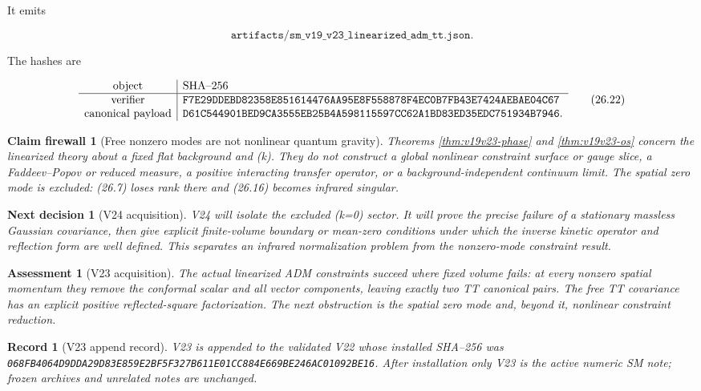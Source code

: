 \documentclass[11pt]{article}
\newtheorem{firewall}[theorem]{Claim firewall}
\newtheorem{decision}[theorem]{Next decision}
\newtheorem{assessment}[theorem]{Assessment}
\newtheorem{record}[theorem]{Record}
\theoremstyle{remark}
\begin{document}
It emits

\[
 \texttt{artifacts/sm\_v19\_v23\_linearized\_adm\_tt.json}.  \tag{26.21}
\]

The hashes are

\[
\begin{array}{c|l}
\hbox{object}&\hbox{SHA--256}\\ \hline
\hbox{verifier}&
\texttt{F7E29DDEBD82358E851614476AA95E8F558878F4EC0B7FB43E7424AEBAE04C67}\\
\hbox{canonical payload}&
\texttt{D61C544901BED9CA3555EB25B4A598115597CC62A1BD83ED35EDC751934B7946}.
\end{array}                                                     \tag{26.22}
\]

\begin{firewall}[Free nonzero modes are not nonlinear quantum gravity]
\label{fire:v19v23}
Theorems \ref{thm:v19v23-phase} and \ref{thm:v19v23-os} concern the
linearized theory about a fixed flat background and (k).  They do
not construct a global nonlinear constraint surface or gauge slice, a
Faddeev--Popov or reduced measure, a positive interacting transfer
operator, or a background-independent continuum limit.  The spatial zero
mode is excluded: (26.7) loses rank there and (26.16) becomes infrared
singular.
\end{firewall}

\begin{decision}[V24 acquisition]
\label{dec:v19v23-next}
V24 will isolate the excluded (k=0) sector.  It will prove the precise
failure of a stationary massless Gaussian covariance, then give explicit
finite-volume boundary or mean-zero conditions under which the inverse
kinetic operator and reflection form are well defined.  This separates an
infrared normalization problem from the nonzero-mode constraint result.
\end{decision}

\begin{assessment}[V23 acquisition]
\label{ass:v19v23}
The actual linearized ADM constraints succeed where fixed volume fails:
at every nonzero spatial momentum they remove the conformal scalar and
all vector components, leaving exactly two TT canonical pairs.  The free
TT covariance has an explicit positive reflected-square factorization.
The next obstruction is the spatial zero mode and, beyond it, nonlinear
constraint reduction.
\end{assessment}

\begin{record}[V23 append record]
\label{rec:v19v23}
V23 is appended to the validated V22 whose installed SHA--256 was
\texttt{068FB4064D9DDA29D83E859E2BF5F327B611E01CC884E669BE246AC01092BE16}.
After installation only V23 is the active numeric SM note; frozen archives
and unrelated notes are unchanged.
\end{record}
\end{document}
